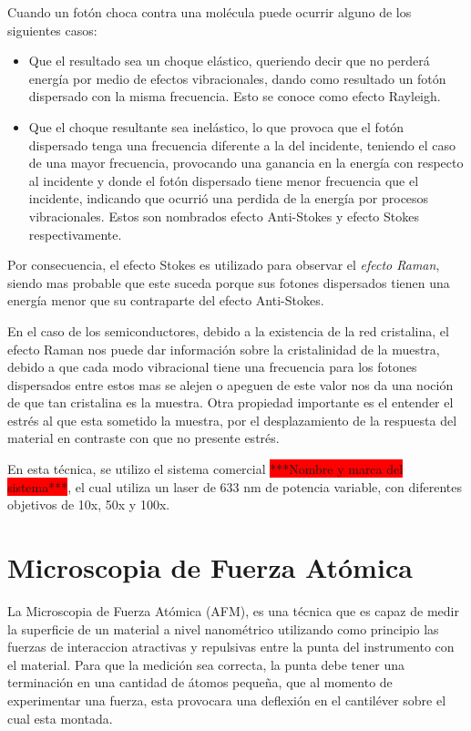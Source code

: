 Cuando un fotón choca contra una molécula puede ocurrir alguno de los siguientes casos:
    \begin{itemize}
        \item Que el resultado sea un choque elástico, queriendo decir que no perderá energía por medio de efectos vibracionales, dando como resultado un fotón dispersado con la misma frecuencia. Esto se conoce como efecto Rayleigh.

        \item Que el choque resultante sea inelástico, lo que provoca que el fotón dispersado tenga una frecuencia diferente a la del incidente, teniendo el caso de una mayor frecuencia, provocando una ganancia en la energía con respecto al incidente y donde el fotón dispersado tiene menor frecuencia que el incidente, indicando que ocurrió una perdida de la energía por procesos vibracionales. Estos son nombrados efecto Anti-Stokes y efecto Stokes respectivamente.
    \end{itemize}

Por consecuencia, el efecto Stokes es utilizado para observar el \textit{efecto Raman}, siendo mas probable que este suceda porque sus fotones dispersados tienen una energía menor que su contraparte del efecto Anti-Stokes.

En el caso de los semiconductores, debido a la existencia de la red cristalina, el efecto Raman nos puede dar información sobre la cristalinidad de la muestra, debido a que cada modo vibracional tiene una frecuencia para los fotones dispersados entre estos mas se alejen o apeguen de este valor nos da una noción de que tan cristalina es la muestra.\cite{Nassar2016}\cite{Qiu2021} Otra propiedad importante es el entender el estrés al que esta sometido la muestra, por el desplazamiento de la respuesta del material en contraste con que no presente estrés.\cite{Weber2000}

En esta técnica, se utilizo el sistema comercial \colorbox{red}{***Nombre y marca del sistema***}, el cual utiliza un laser de 633 nm de potencia variable, con diferentes objetivos de 10x, 50x y 100x.

\section{Microscopia de Fuerza Atómica}
\label{sec:chap3-afm}
La Microscopia de Fuerza Atómica (AFM), es una técnica que es capaz de medir la superficie de un material a nivel nanométrico utilizando como principio las fuerzas de interaccion atractivas y repulsivas entre la punta del instrumento con el material. Para que la medición sea correcta, la punta debe tener una terminación en una cantidad de átomos pequeña, que al momento de experimentar una fuerza, esta provocara una deflexión en el cantiléver sobre el cual esta 
montada.\cite{Binnig1986}


